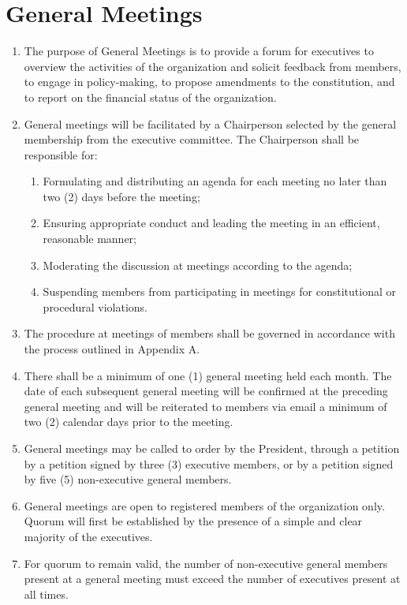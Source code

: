 \documentclass[12pt]{article}
\begin{document}
\section{General Meetings}
\begin{enumerate}[{7}.1]
    \item The purpose of General Meetings is to provide a forum for executives to overview the activities of the organization and solicit feedback from members, to engage in policy-making, to propose amendments to the constitution, and to report on the financial status of the organization.
    \item General meetings will be facilitated by a Chairperson selected by the general membership from the executive committee. The Chairperson shall be responsible for:
    \begin{enumerate}[{7.2}.1]
        \item	Formulating and distributing an agenda for each meeting no later than two (2) days before the meeting;
        \item	Ensuring appropriate conduct and leading the meeting in an efficient, reasonable manner;
        \item	Moderating the discussion at meetings according to the agenda;
        \item	Suspending members from participating in meetings for constitutional or procedural violations. 
    \end{enumerate}
    \item The procedure at meetings of members shall be governed in accordance with the process outlined in Appendix A.
    \item There shall be a minimum of one (1) general meeting held each month. The date of each subsequent general meeting will be confirmed at the preceding general meeting and will be reiterated to members via email a minimum of two (2) calendar days prior to the meeting.
    \item General meetings may be called to order by the President, through a petition by a petition signed by three (3) executive members, or by a petition signed by five (5) non-executive general members. 
    \item General meetings are open to registered members of the organization only. Quorum will first be established by the presence of a simple and clear majority of the executives. 
    \item For quorum to remain valid, the number of non-executive general members present at a general meeting must exceed the number of executives present at all times. 

\end{enumerate}
\end{document}
